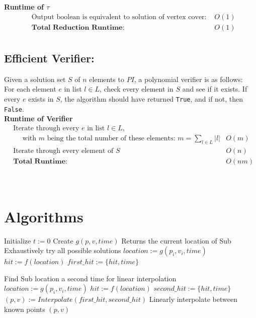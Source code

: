 \documentclass[11pt]{article}
\begin{document}
\textbf{Runtime of $\tau$ }
\begin{align*}
&\text{Output boolean is equivalent to solution of vertex cover: } &O(1)\\ 
&\textbf{Total Reduction Runtime: } &O(1)\\
\end{align*}


\subsection{Efficient Verifier:}
Given a solution set $S$ of $n$ elements to $PI$, a polynomial verifier is as follows:\\

For each element $e$ in list $l \in L$, check every element in $S$ and see if it exists. If every $e$ exists in $S$, the algorithm should have returned \texttt{True}, and if not, then \texttt{False}. \\

\textbf{Runtime of Verifier }
\begin{align*}
&\text{Iterate through every $e$ in list $l \in L$,}\\
&\text{$\quad$ with $m$ being the total number of these elements: $m = \sum_{l \in L} |l|$} &O(m)\\ 
&\text{Iterate through every element of $S$ } &O(n)\\ 
&\textbf{Total Runtime: } &O(nm)\\
\end{align*}

\begin{center}
\quad{}\quad{}\\
\end{center}

\section{Algorithms}
\begin{algorithmic}[1]
\State Initialize $t:=0$
\State Create $g(p,v,time)$
\Comment Returns the current location of Sub 
\Comment  Exhaustively try all possible solutions
\State $location := g(p_i,v_i,time)$
\State $hit := f(location)$
 $first\_hit := \{hit, time\}$
\EndIf
\EndFor

\Comment  Find Sub location a second time for linear interpolation
\State $location := g(p_i,v_i,time)$
\State $hit := f(location)$
 $second\_hit := \{hit, time\}$
\EndIf
\EndFor
\State $(p, v) := Interpolate(first\_hit, second\_hit)$
\Comment Linearly interpolate between known points
\Return $(p, v)$

\end{algorithmic}
\end{document}
